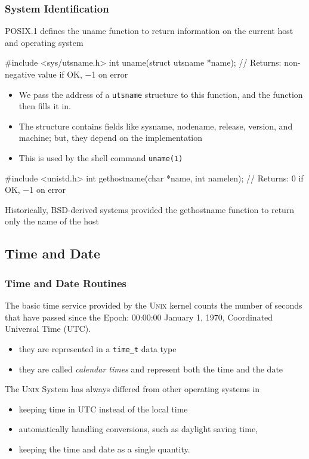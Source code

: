 \documentclass[newPxFont,sthlmFooter,nooffset]{beamer}
\begin{document}
\begin{frame}[containsverbatim,t]
  \frametitle{System Identification}
POSIX.1 defines the uname function to return information on the current host and operating system

\begin{codedef}
#include <sys/utsname.h>
int uname(struct utsname *name);
// Returns: non-negative value if OK, −1 on error  
\end{codedef}

{\footnotesize
  \begin{itemize}
  \item We pass the address of a \texttt{utsname} structure to this function, and the function then fills it in.
  \item The structure contains fields like sysname, nodename, release, version, and machine; but, they depend on the implementation
  \item This is used by the shell command \texttt{uname(1)}
  \end{itemize}
}


\begin{codedef}
#include <unistd.h>
int gethostname(char *name, int namelen);
// Returns: 0 if OK, −1 on error
\end{codedef}
Historically, BSD-derived systems provided the gethostname function to return only the name of the host


\end{frame}


\subsection{Time and Date}

\begin{frame}[t]
  \frametitle{Time and Date Routines}
The basic time service provided by the \textsc{Unix} kernel counts the number of seconds that have passed since the Epoch: 00:00:00 January 1, 1970, Coordinated Universal Time (UTC). 
\begin{itemize}
\item they are represented in a \texttt{time\_t} data type
\item they are called \textit{calendar times} and represent both the time and the date
\end{itemize}



The \textsc{Unix} System has always differed from other operating systems in
\begin{itemize}
\item keeping time in UTC instead of the local time
\item automatically handling conversions, such as daylight saving time,
\item keeping the time and date as a single quantity.
\end{itemize}


\end{frame}
\end{document}
